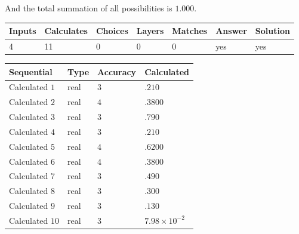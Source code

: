 \documentclass[12pt]{article}
\begin{document}
\noindent
 And the total summation of all possibilities is $  %
1.000 $.
 
 
 
\noindent{}
 
 

 
\vspace{0.3in}
   
   
   
   
\noindent\begin{tabular}{|l|l|l|l|l|l|l|}
 \hline
Inputs & Calculates & Choices & Layers & Matches & Answer & Solution \\ \hline
           4 & 
          11 & 
           0
  & 
           0 & 
           0 & 
  yes & 
  yes 
  \\ \hline
 \end{tabular}
   
   
   
   
\noindent{}
   
   
  
  
\noindent\begin{tabular}{|l|l|l|l|}
\hline
 Sequential & Type & Accuracy & Calculated \\ 
\hline
 
 
  Calculated $           1$ & real & $           3 $ & 
 $ .210 $ 
 \\  \hline  
 
 
  Calculated $           2$ & real & $           4 $ & 
 $ .3800 $ 
 \\  \hline  
 
 
  Calculated $           3$ & real & $           3 $ & 
 $ .790 $ 
 \\  \hline  
 
 
  Calculated $           4$ & real & $           3 $ & 
 $ .210 $ 
 \\  \hline  
 
 
  Calculated $           5$ & real & $           4 $ & 
 $ .6200 $ 
 \\  \hline  
 
 
  Calculated $           6$ & real & $           4 $ & 
 $ .3800 $ 
 \\  \hline  
 
 
  Calculated $           7$ & real & $           3 $ & 
 $ .490 $ 
 \\  \hline  
 
 
  Calculated $           8$ & real & $           3 $ & 
 $ .300 $ 
 \\  \hline  
 
 
  Calculated $           9$ & real & $           3 $ & 
 $ .130 $ 
 \\  \hline  
 
 
  Calculated $          10$ & real & $           3 $ & 
 $ 7.98 \times 10^{-2} $ 
 \\  \hline  
 \end{tabular}
   
\end{document}
